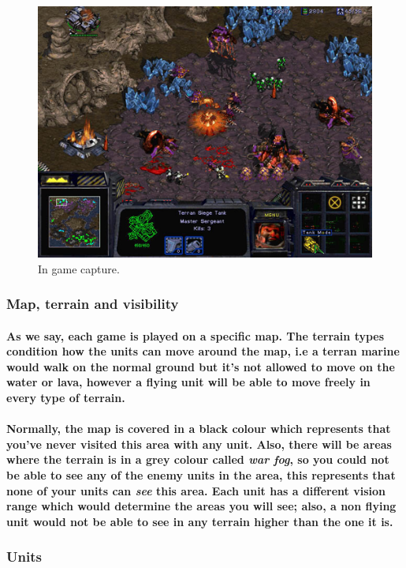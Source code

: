 \documentclass[a4paper,10pt]{article}
\newcommand{\p}[1]{\paragraph{\indent\textnormal{#1}}}
\begin{document}
  \begin{figure}[hbt]
  \begin{center}
  \includegraphics[scale=.8]{diapos1/iso.png}
  \end{center}
  \caption{In game capture.}
  \label{fig:rb1}
  \end{figure}

    \subsubsection{Map, terrain and visibility}

      \p{As we say, each game is played on a specific map. The terrain types condition how the units can move around the map, i.e a terran marine would walk on the normal ground but it's not allowed to move on the water or lava, however a flying unit will be able to move freely in every type of terrain.}

      \p{Normally, the map is covered in a black colour which represents that you've never visited this area with any unit. Also, there will be areas where the terrain is in a grey colour called \textit{war fog}, so you could not be able to see any of the enemy units in the area, this represents that none of your units can \textit{see} this area. Each unit has a different \textbf{vision range} which would determine the areas you will see; also, a non flying unit would not be able to see in any terrain higher than the one it is.}


    \subsubsection{Units}
\end{document}
